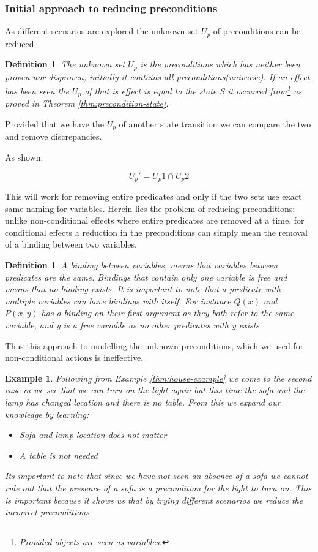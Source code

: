 \documentclass[../Master.tex]{subfiles}
\begin{document}
 
\subsubsection{Initial approach to reducing preconditions}
As different scenarios are explored the unknown set $U_p$ of preconditions can be reduced.
\newtheorem{thm-unknown-set}{Definition}
\begin{thm-unknown-set}
The unknown set $U_p$ is the preconditions which has neither been proven nor disproven, initially it contains all  preconditions(universe). If an effect has been seen the $U_p$ of that is effect is equal to the state S it occurred from\footnote{Provided objects are seen as variables.} as proved in Theorem \ref{thm:precondition-state}.
\end{thm-unknown-set}
Provided that we have the $U_p$ of another state transition we can compare the two and remove discrepancies. 

As shown:

\begin{equation}
	U_p' = U_p1 \cap U_p2
\end{equation}

This will work for removing entire predicates and only if the two sets use exact same naming for variables. Herein lies the problem of reducing preconditions; unlike non-conditional effects where entire predicates are removed at a time, for conditional effects a reduction in the preconditions can simply mean the removal of a binding between two variables. 
\newtheorem{thm-binding}{Definition}
\begin{thm-binding}
	A binding between variables, means that variables between predicates are the same. 
	Bindings that contain only one variable is free and means that no binding exists. 
	It is important to note that a predicate with multiple variables can have bindings with itself.
	For instance $Q(x)$ and $P(x,y)$ has a binding on their first argument as they both refer to the same variable, and y is a free variable as no other predicates with y exists.
\end{thm-binding} 
Thus this approach to modelling the unknown preconditions, which we used for non-conditional actions is ineffective. 

\newtheorem{thm-house-example-2}{Example}[section]
\begin{thm-house-example-2}\label{thm:house-example-2}
Following from Example \ref{thm:house-example} we come to the second case in 
we see that we can turn on the light again but this time the sofa and the lamp has changed location and
there is no table. From this we expand our knowledge by learning:
\begin{itemize}
	\item Sofa and lamp location does not matter
	\item A table is not needed
\end{itemize}
Its important to note that since we have not seen an absence of a sofa we cannot rule out that the presence of a sofa is a precondition for the light to turn on. This is important because it shows us that by trying different scenarios we reduce the incorrect preconditions.
\end{thm-house-example-2}
\end{document}
